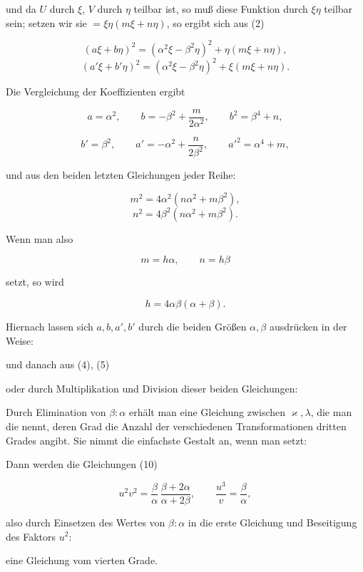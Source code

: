 und da $U$ durch $\xi$, $V$ durch $\eta$ teilbar ist, so muß diese
Funktion durch $\xi\eta$ teilbar sein; setzen wir sie
$=\xi\eta(m\xi+n\eta)$, so ergibt sich aus (2)

\[
(a\xi+b\eta)^2=(\alpha^2\xi-\beta^2\eta)^2+\eta(m\xi+n\eta),
\]
\[
(a'\xi+b'\eta)^2=(\alpha^2\xi-\beta^2\eta)^2+\xi(m\xi+n\eta).
\]

Die Vergleichung der Koeffizienten ergibt

\[
a=\alpha^2, \qquad b=-\beta^2+\frac{m}{2\alpha^2}, \qquad b^2=\beta^4+n,
\]

\[
b'=\beta^2, \qquad a'=-\alpha^2+\frac{n}{2\beta^2}, \qquad a'^2=\alpha^4+m,
\]

und aus den beiden letzten Gleichungen jeder Reihe:

\[
m^2=4\alpha^2(n\alpha^2+m\beta^2),
\]
\[
n^2=4\beta^2(n\alpha^2+m\beta^2).
\]

Wenn man also

\[
m=h\alpha, \qquad n=h\beta
\]

setzt, so wird

\[
h=4\alpha\beta(\alpha+\beta).
\]

Hiernach lassen sich $a,b,a',b'$ durch die beiden Größen $\alpha,\beta$
ausdrücken in der Weise:


und danach aus (4), (5)


oder durch Multiplikation und Division dieser beiden Gleichungen:


Durch Elimination von $\beta:\alpha$ erhält man eine Gleichung zwischen
$\varkappa,\lambda$, die man die  nennt, deren Grad die
Anzahl der verschiedenen Transformationen dritten Grades angibt. Sie
nimmt die einfachste Gestalt an, wenn man setzt:


Dann werden die Gleichungen (10)

\[
u^2v^2=\frac{\beta}{\alpha}\,\frac{\beta+2\alpha}{\alpha+2\beta}, \qquad
\frac{u^3}{v}=\frac{\beta}{\alpha},
\]

also durch Einsetzen des Wertes von $\beta:\alpha$ in die erste
Gleichung und Beseitigung des Faktors $u^2$:


eine Gleichung vom vierten Grade.
